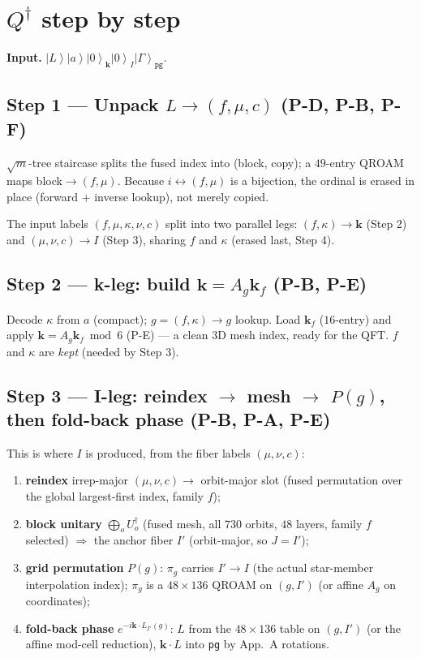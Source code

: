 \documentclass[11pt]{article}
\newcommand{\ket}[1]{\left|#1\right\rangle}
\newcommand{\reg}[1]{\texttt{#1}}
\begin{document}
\section{$Q^\dagger$ step by step}

\noindent\textbf{Input.} $\ket{L}\ket{a}\ket{0}_{\mathbf k}\ket{0}_I\ket{\Gamma}_{\reg{pg}}$.

\subsection*{Step 1 --- Unpack $L\to(f,\mu,c)$ \hfill (P-D, P-B, P-F)}
$\sqrt m$-tree staircase splits the fused index into (block, copy); a $49$-entry QROAM maps
block$\to(f,\mu)$. Because $i\!\leftrightarrow\!(f,\mu)$ is a bijection, the ordinal is erased in place
(forward $+$ inverse lookup), not merely copied.

The input labels $(f,\mu,\kappa,\nu,c)$ split into two parallel legs: $(f,\kappa)\!\to\!\mathbf k$
(Step 2) and $(\mu,\nu,c)\!\to\!I$ (Step 3), sharing $f$ and $\kappa$ (erased last, Step 4).

\subsection*{Step 2 --- k-leg: build $\mathbf k=A_g\mathbf k_f$ \hfill (P-B, P-E)}
Decode $\kappa$ from $a$ (compact); $g=(f,\kappa)\!\to\!g$ lookup. Load $\mathbf k_f$ ($16$-entry) and
apply $\mathbf k=A_g\mathbf k_f \bmod 6$ (P-E) --- a clean 3D mesh index, ready for the QFT. $f$ and
$\kappa$ are \emph{kept} (needed by Step 3).

\subsection*{Step 3 --- I-leg: reindex $\to$ mesh $\to$ $P(g)$, then fold-back phase \hfill (P-B, P-A, P-E)}
This is where $I$ is produced, from the fiber labels $(\mu,\nu,c)$:
\begin{enumerate}[leftmargin=1.6em,topsep=1pt]
  \item \textbf{reindex} irrep-major $(\mu,\nu,c)\to$ orbit-major slot (fused permutation over the
  global largest-first index, family $f$);
  \item \textbf{block unitary} $\bigoplus_o U_o^\dagger$ (fused mesh, all $730$ orbits, $48$ layers,
  family $f$ selected) $\Rightarrow$ the anchor fiber $I'$ (orbit-major, so $J=I'$);
  \item \textbf{grid permutation} $P(g)$: $\pi_g$ carries $I'\!\to\!I$ (the actual star-member
  interpolation index); $\pi_g$ is a $48\times136$ QROAM on $(g,I')$ (or affine $A_g$ on coordinates);
  \item \textbf{fold-back phase} $e^{-i\mathbf k\cdot L_{I'}(g)}$: $L$ from the $48\times136$ table on
  $(g,I')$ (or the affine mod-cell reduction), $\mathbf k\!\cdot\!L$ into \reg{pg} by App.\ A rotations.
\end{enumerate}
\end{document}
